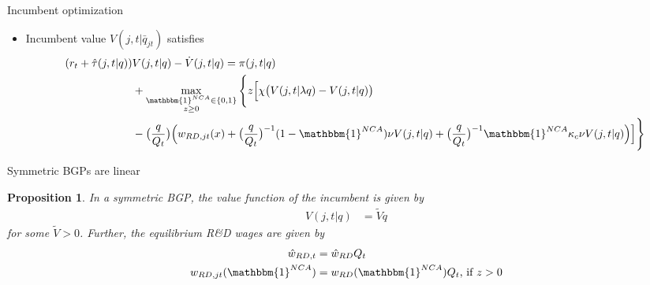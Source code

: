 \documentclass[english,usenames,dvipsnames,handout]{beamer}
\newtheorem{proposition}{Proposition}
\begin{document}
\begin{frame}{Incumbent optimization}\label{HJB_incumbent}
\hyperlink{closing_the_model}{}
\begin{itemize}
\item Incumbent value $V(j,t|\bar{q}_{jt})$ satisfies
\tiny
\begin{align*}
	(r_t + \hat{\tau}(j,t|q)) &V(j,t |q) - \dot{V}(j,t|q) = \pi(j,t|q) \nonumber \\_{}
	&+ \max_{\substack{\mathbbm{1}^{NCA} \in \{0,1\} \\ z \ge 0}} \Bigg\{ z \Big[ \chi \big( V(j,t|\lambda q) - V(j,t|q)\big)  \nonumber \\
	&- \big(\frac{q}{Q_t}\big) \Big( w_{RD,jt}(x) + \big(\frac{q}{Q_t}\big)^{-1} (1-\mathbbm{1}^{NCA}) \nu V(j,t|q) + \big(\frac{q}{Q_t}\big)^{-1}  \mathbbm{1}^{NCA} \kappa_c \nu V(j,t|q) \Big)  \Big] \Bigg\} 
\end{align*}
\end{itemize}
\end{frame}


\begin{frame}{Symmetric BGPs are linear}\label{proposition:hjb_scaling}
	\hyperlink{closing_the_model}{}
	\small
	\begin{proposition}
		In a symmetric BGP, the value function of the incumbent is given by
		\begin{align*}
		V(j,t|q) &= \tilde{V} q
		\end{align*}
		for some $\tilde{V} > 0$. Further, the equilibrium R\&D wages are given by 
		\begin{align*}
		\hat{w}_{RD,t} &= \hat{w}_{RD} Q_t \\
		w_{RD,jt}(\mathbbm{1}^{NCA}) &= w_{RD}(\mathbbm{1}^{NCA}) Q_t \textrm{, if $z > 0$}
		\end{align*}
	\end{proposition}
\end{frame}
\end{document}
